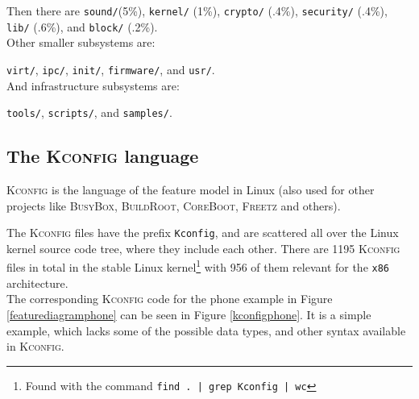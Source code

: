 \documentclass[a4paper,11pt]{report}
\newcommand{\f}{\footnote{\fn}}
\newcommand{\textcode}[1]{\fboxsep=1pt\texttt{\colorbox{gray!20}{#1}}}
\newcommand{\figa}{
    \begin{figure}[!htpb]
    \centering
}
\newcommand{\figb}[2]{
    \caption{#1}
    \label{#2}
    \end{figure}
}
\begin{document}
Then there are \texttt{sound/}(5\%),  \texttt{kernel/} 
(1\%), \texttt{crypto/} (.4\%), \texttt{security/}  (.4\%), \texttt{lib/} 
(.6\%), and \texttt{block/} (.2\%).
\\

Other smaller subsystems are:

\texttt{virt/}, \texttt{ipc/}, \texttt{init/}, \texttt{firmware/}, and \texttt{usr/}.
\\

And infrastructure subsystems are:

\texttt{tools/}, \texttt{scripts/}, and \texttt{samples/}.

            \subsection{The \textsc{Kconfig} language} 
\textsc{Kconfig} is the language of the feature model in Linux (also used for 
other projects like \textsc{BusyBox}, \textsc{BuildRoot}, \textsc{CoreBoot}, 
\textsc{Freetz} and others)\cite[p. 4]{VarModSSD}.

            \def \fn{Found with the command \textcode{find .\ | grep Kconfig | wc}}

The \textsc{Kconfig} files have the prefix \textcode{Kconfig}, and are 
scattered all over the Linux kernel source code tree, where they include each 
other. There are 1195 \textsc{Kconfig} files in total in the stable Linux kernel\f
with 956 of them relevant for the \texttt{x86} architecture.
\\

The corresponding \textsc{Kconfig} code for the phone example in Figure 
\ref{featurediagramphone} can be seen in Figure \ref{kconfigphone}. It 
is a simple example, which lacks some of the possible data types, and other 
syntax available in \textsc{Kconfig}.
\end{document}
